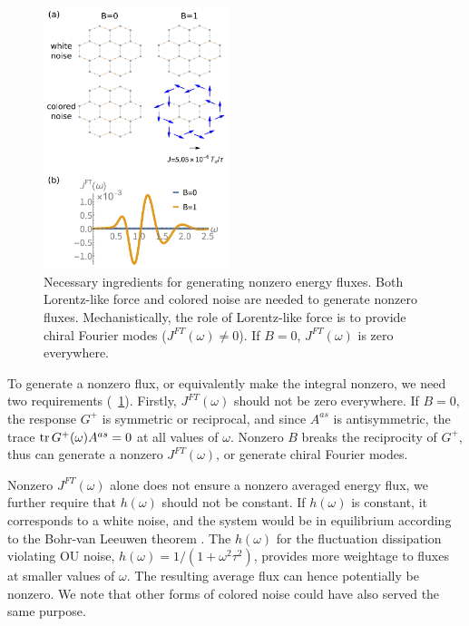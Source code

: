 \documentclass[
 preprint,
 preprintnumbers,
 amsmath,amssymb,
 aps,
 pre,
 longbibliography,
 superscriptaddress,
 10pt, twocolumn
]{revtex4-1}
\begin{document}
\begin{figure}[ht]
	\centering
	\includegraphics[width=0.48\textwidth]{ingredients.pdf}
    \caption{
    Necessary ingredients for generating nonzero energy fluxes.
    Both Lorentz-like force and colored noise are needed to generate nonzero fluxes. Mechanistically, the role of Lorentz-like force is to provide chiral Fourier modes ($J^{FT}(\omega)\neq 0$). If $B=0$, $J^{FT}(\omega)$ is zero everywhere.
    }
    \label{fig:ingredients}
\end{figure}

To generate a nonzero flux, or equivalently make the integral nonzero, we need two requirements (\figurename~\ref{fig:ingredients}).
Firstly, $J^{FT}(\omega)$ should not be zero everywhere.
If $B=0$, the response $G^+$ is symmetric or reciprocal, and since $A^{as}$ is antisymmetric, the trace $\tr G^+(\omega) A^{as}=0$ at all values of $\omega$. Nonzero $B$ breaks the reciprocity of $G^+$, thus can generate a nonzero $J^{FT}(\omega)$, or generate chiral Fourier modes.

Nonzero $J^{FT}(\omega)$ alone does not ensure a nonzero averaged energy flux, we further require that $h(\omega)$ should not be constant.
If $h(\omega)$ is constant, it corresponds to a white noise, and the system would be in equilibrium according to the Bohr-van Leeuwen theorem \cite{Pradhan2010NonexistenceClassical}.
The $h(\omega)$ for the fluctuation dissipation violating OU noise, $h(\omega)=1/(1+\omega^2\tau^2)$, provides more weightage to fluxes at smaller values of $\omega$. The resulting average flux can hence potentially be nonzero. We note that other forms of colored noise could have also served the same purpose.
\end{document}
